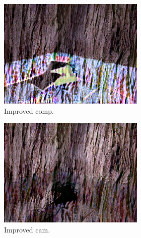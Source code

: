 \begin{figure}[]
\begin{subfigure}{\textwidth}
        \begin{subfigure}{0.24\textwidth}
            \centering
            \includegraphics[width=\textwidth]{images/04-experiment02/sofa/wood/improved_im.jpg}
            \caption*{Improved comp.}
        \end{subfigure}
        \hfill
        \begin{subfigure}{0.24\textwidth}
            \centering
            \includegraphics[width=\textwidth]{images/04-experiment02/sofa/wood/improved_proj.jpg}
            \caption*{Improved cam.}
        \end{subfigure}
        \hfill
        \begin{subfigure}{0.24\textwidth}
            \centering

\end{subfigure}
\end{subfigure}
\end{figure}
